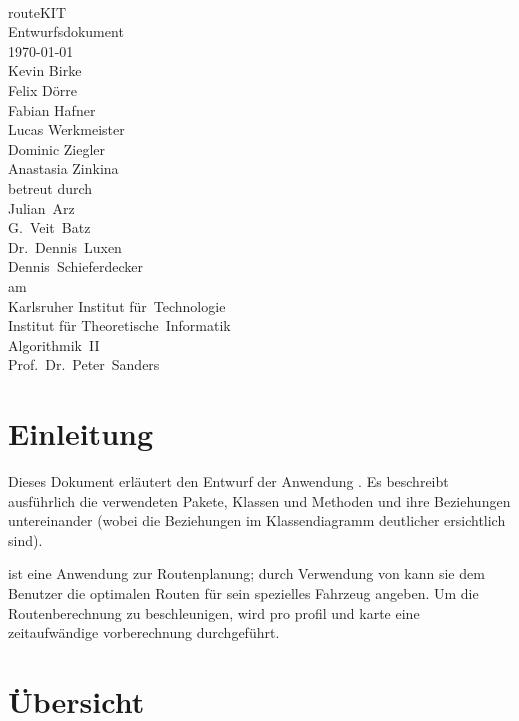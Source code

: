 \documentclass[a4paper, 11pt]{article}
\begin{document}
\begin{titlepage}
\makeatletter
\begin{center}
~\\[5em]
{\Huge routeKIT}\\[3em]
{\huge Entwurfsdokument}\\[1em]
{\large\today}\\[2.5em]
{\LARGE
Kevin Birke\\
Felix Dörre\\
Fabian Hafner\\
Lucas Werkmeister\\
Dominic Ziegler\\
Anastasia Zinkina\\[3em]}
betreut durch\\[2em]
{\Large
Julian~Arz\\
G.~Veit~Batz\\
Dr.~Dennis~Luxen\\
Dennis~Schieferdecker\\[1em]}
am\\[1em]
{\Large
Karlsruher Institut für~Technologie\\
Institut für Theoretische~Informatik\\
Algorithmik~II\\
\large
Prof.~Dr.~Peter~Sanders}
\end{center}
\makeatother
\end{titlepage}
\tableofcontents
\newpage


\section{Einleitung}

Dieses Dokument erläutert den Entwurf der Anwendung \routeKIT. %
Es beschreibt ausführlich die verwendeten Pakete, Klassen und Methoden und ihre Beziehungen untereinander (wobei die Beziehungen im Klassendiagramm deutlicher ersichtlich sind).

\routeKIT ist eine Anwendung zur Routenplanung; durch Verwendung von  kann sie dem Benutzer die optimalen Routen für sein spezielles Fahrzeug angeben.
Um die Routenberechnung zu beschleunigen, wird pro \gls{profil} und \gls{karte} eine zeitaufwändige \gls{vorberechnung} durchgeführt.


\section{Übersicht}
\end{document}
